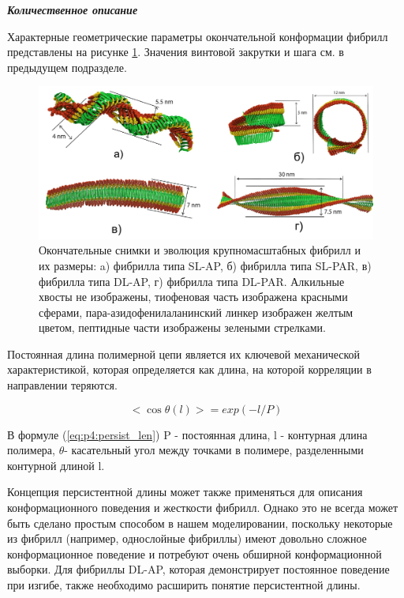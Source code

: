     \emph{\textbf{Количественное описание}}

    Характерные геометрические параметры окончательной конформации фибрилл представлены на рисунке \ref{fig:p4_p5_f46}. Значения винтовой закрутки и шага см. в предыдущем подразделе.

\begin{figure} [H]
    \centering
    \includegraphics[width=\textwidth]{images/p4/punkt5/part4_p5_f46.pdf}
    \caption[Окончательные снимки и эволюция крупномасштабных фибрилл и их размеры]{Окончательные снимки и эволюция крупномасштабных фибрилл и их размеры: a) фибрилла типа SL-AP, б) фибрилла типа SL-PAR, в) фибрилла типа DL-AP, г) фибрилла типа DL-PAR. Алкильные хвосты не изображены, тиофеновая часть изображена красными сферами, пара-азидофенилаланинский линкер изображен желтым цветом, пептидные части изображены зелеными стрелками.}
    \label{fig:p4_p5_f46}
\end{figure}

    Постоянная длина полимерной цепи является их ключевой механической характеристикой, которая определяется как длина, на которой корреляции в направлении теряются.

\begin{equation}
    <\cos \theta(l) > = exp (-l / P)   
    \label{eq:p4:persist_len}
\end{equation}

    В формуле (\ref{eq:p4:persist_len}) P - постоянная длина, l - контурная длина полимера, $\theta$- касательный угол между точками в полимере, разделенными контурной длиной l.

    Концепция персистентной длины может также применяться для описания конформационного поведения и жесткости фибрилл. Однако это не всегда может быть сделано простым способом в нашем моделировании, поскольку некоторые из фибрилл (например, однослойные фибриллы) имеют довольно сложное конформационное поведение и потребуют очень обширной конформационной выборки. Для фибриллы DL-AP, которая демонстрирует постоянное поведение при изгибе, также необходимо расширить понятие персистентной длины.

